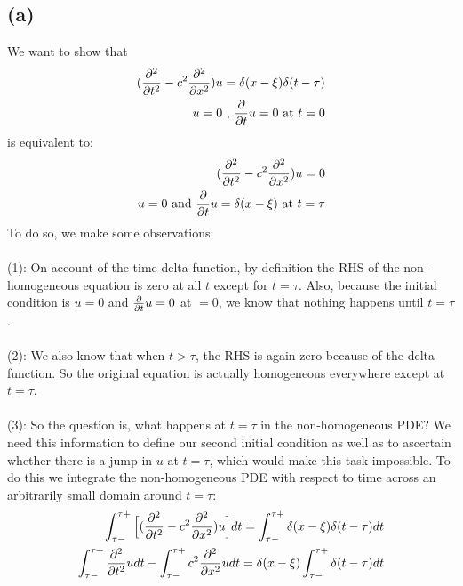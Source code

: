 \documentclass{article}
\begin{document}
\subsection*{\textbf{(a)}}
We want to show that 
\begin{equation}
\begin{aligned}
(\pdv[2]{}{t} - c^2\pdv[2]{}{x})u =\delta(x-\xi)\delta(t-\tau)\\
u = 0 \text{ , }\pdv{}{t}u = 0 \text{ at } t=0\\
\end{aligned}
\end{equation}
is equivalent to:
\begin{equation}
\begin{aligned}
(\pdv[2]{}{t} - c^2\pdv[2]{}{x})u = 0\\
u = 0 \text{ and } \pdv{}{t}u = \delta(x-\xi) \text{ at } t=\tau
\end{aligned}
\end{equation}
To do so, we make some observations: \\
\\
(1): On account of the time delta function, by definition the RHS of the non-homogeneous equation is zero at all $t$ except for $t=\tau$. Also, because the initial condition is $u=0$ and $\pdv{}{t}u = 0$ at $=0$, we know that nothing happens until $t=\tau$. \\
\\
(2): We also know that when $t>\tau$, the RHS is again zero because of the delta function. So the original equation is actually homogeneous everywhere except at $t=\tau$.\\
\\
(3): So the question is, what happens at $t=\tau$ in the non-homogeneous PDE? We need this information to define our second initial condition as well as to ascertain whether there is a jump in $u$ at $t=\tau$, which would make this task impossible. To do this we integrate the non-homogeneous PDE with respect to time across an arbitrarily small domain around $t=\tau$:
\begin{equation}
\begin{aligned}
\int_{\tau -}^{\tau +}\Big{[} (\pdv[2]{}{t} - c^2\pdv[2]{}{x})u \Big{]}dt = \int_{\tau -}^{\tau+}\delta(x-\xi)\delta (t-\tau)dt\\
\int_{\tau -}^{\tau +}\pdv[2]{}{t}u dt - \int_{\tau -}^{\tau +}c^2\pdv[2]{}{x}u dt = \delta (x-\xi)\int_{\tau -}^{\tau+}\delta (t-\tau)dt
\end{aligned}
\end{equation}
\end{document}
